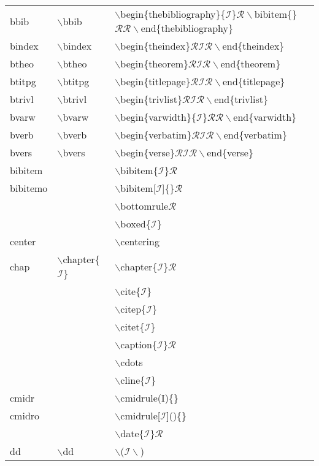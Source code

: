 \begin{longtable}{p{20mm}p{20mm}p{65mm}}
bbib & $\backslash$bbib & $\backslash$begin\{thebibliography\}\{$\mathcal{I}$\}$\mathcal{R}\backslash$bibitem\{\} $\mathcal{RR}\backslash$end\{thebibliography\}\\
bindex & $\backslash$bindex & $\backslash$begin\{theindex\}$\mathcal{RIR}\backslash$end\{theindex\}\\
btheo & $\backslash$btheo & $\backslash$begin\{theorem\}$\mathcal{RIR}\backslash$end\{theorem\}\\
btitpg & $\backslash$btitpg & $\backslash$begin\{titlepage\}$\mathcal{RIR}\backslash$end\{titlepage\}\\
btrivl & $\backslash$btrivl & $\backslash$begin\{trivlist\}$\mathcal{RIR}\backslash$end\{trivlist\}\\
bvarw & $\backslash$bvarw & $\backslash$begin\{varwidth\}\{$\mathcal{I}$\}$\mathcal{RR}\backslash$end\{varwidth\}\\
bverb & $\backslash$bverb & $\backslash$begin\{verbatim\}$\mathcal{RIR}\backslash$end\{verbatim\}\\
bvers & $\backslash$bvers & $\backslash$begin\{verse\}$\mathcal{RIR}\backslash$end\{verse\}\\
bibitem &  & $\backslash$bibitem\{$\mathcal{I}$\}$\mathcal{R}$\\
bibitemo &  & $\backslash$bibitem[$\mathcal{I}$]\{\}$\mathcal{R}$\\
 &  & $\backslash$bottomrule$\mathcal{R}$\\
 &  & $\backslash$boxed\{$\mathcal{I}$\}\\
center &  & $\backslash$centering\\
chap & $\backslash$chapter\{$\mathcal{I}$\} & $\backslash$chapter\{$\mathcal{I}$\}$\mathcal{R}$\\
 &  & $\backslash$cite\{$\mathcal{I}$\}\\
 &  & $\backslash$citep\{$\mathcal{I}$\}\\
 &  & $\backslash$citet\{$\mathcal{I}$\}\\
 &  & $\backslash$caption\{$\mathcal{I}$\}$\mathcal{R}$\\
 &  & $\backslash$cdots\\
 &  & $\backslash$cline\{$\mathcal{I}$\}\\
cmidr &  & $\backslash$cmidrule(I)\{\}\\
cmidro &  & $\backslash$cmidrule[$\mathcal{I}$]()\{\}\\
 &  & $\backslash$date\{$\mathcal{I}$\}$\mathcal{R}$\\
dd & $\backslash$dd & $\backslash$($\mathcal{I}\backslash$)\\

\end{longtable}
